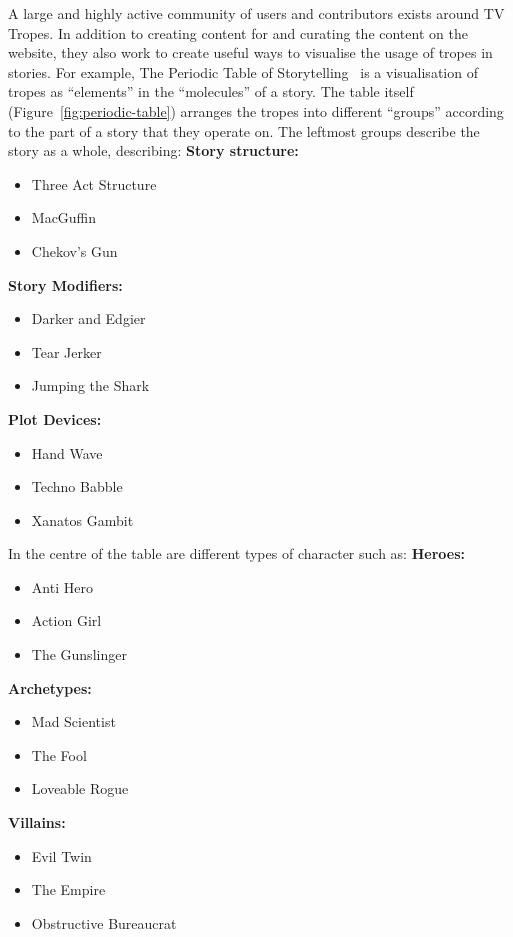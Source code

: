 \documentclass[11pt]{report}
\begin{document}
A large and highly active community of users and contributors exists around TV
Tropes. In addition to creating content for and curating the content on the
website, they also work to create useful ways to visualise the usage of tropes
in stories. For example, The Periodic Table of
Storytelling~\citep{periodicTableOfStorytelling} is a visualisation of tropes as
``elements'' in the ``molecules'' of a story. The table itself
(Figure~\ref{fig:periodic-table}) arranges the tropes into different ``groups''
according to the part of a story that they operate on. The leftmost groups
describe the story as a whole, describing:
\textbf{Story structure:}
\begin{itemize}
  \item Three Act Structure
  \item MacGuffin
  \item Chekov's Gun
\end{itemize}

\textbf{Story Modifiers:}
\begin{itemize}
  \item Darker and Edgier
  \item Tear Jerker
  \item Jumping the Shark
\end{itemize}

\textbf{Plot Devices:}
\begin{itemize}
  \item Hand Wave
  \item Techno Babble
  \item Xanatos Gambit
\end{itemize}

In the centre of the table are different types of character such as:
\textbf{Heroes:}
\begin{itemize}
  \item Anti Hero
  \item Action Girl
  \item The Gunslinger
\end{itemize}

\textbf{Archetypes:}
\begin{itemize}
  \item Mad Scientist
  \item The Fool
  \item Loveable Rogue
\end{itemize}

\textbf{Villains:}
\begin{itemize}
  \item Evil Twin
  \item The Empire
  \item Obstructive Bureaucrat
\end{itemize}
\end{document}
